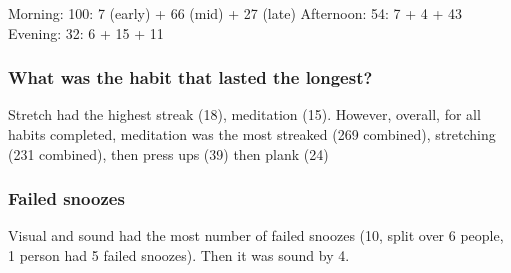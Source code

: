 \documentclass{scaffold/sigchi}
\begin{document}
  Morning: 100: 7 (early) + 66 (mid) + 27 (late)
  Afternoon: 54: 7 + 4 + 43
  Evening: 32: 6 + 15 + 11



\subsubsection{What was the habit that lasted the longest?}
Stretch had the highest streak (18), meditation (15). However, overall, for all habits completed, meditation was the most streaked (269 combined), stretching (231 combined), then press ups (39) then plank (24)

\subsubsection{Failed snoozes}
Visual and sound had the most number of failed snoozes (10, split over 6 people, 1 person had 5 failed snoozes). Then it was sound by 4.







\end{document}
